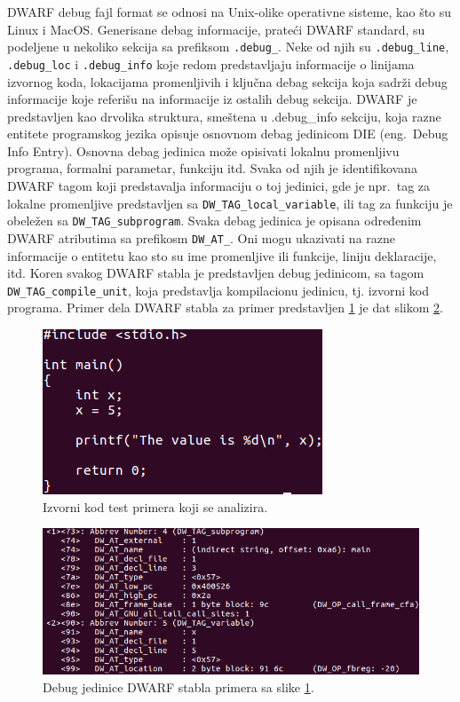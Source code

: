\documentclass[12pt,oneside]{memoir}
\begin{document}
DWARF debug fajl format se odnosi na Unix-olike operativne sisteme, kao što su Linux i MacOS. Generisane debag informacije, prateći DWARF standard, su podeljene u nekoliko sekcija sa prefiksom \texttt{.debug\_}. Neke od njih su \texttt{.debug\_line}, \texttt{.debug\_loc} i \texttt{.debug\_info} koje redom predstavljaju informacije o linijama izvornog koda, lokacijama promenljivih i ključna debag sekcija koja sadrži debug informacije koje referišu na informacije iz ostalih debug sekcija.
DWARF je predstavljen kao drvolika struktura, smeštena u .debug\_info sekciju,  koja razne entitete programskog jezika opisuje osnovnom debag jedinicom DIE (eng.~Debug Info Entry). Osnovna debag jedinica može opisivati lokalnu promenljivu programa, formalni parametar, funkciju itd. Svaka od njih je identifikovana DWARF tagom koji predstavalja informaciju o toj jedinici, gde je npr.~tag za lokalne promenljive predstavljen sa \texttt{DW\_TAG\_local\_variable}, ili tag za funkciju je obeležen sa \texttt{DW\_TAG\_subprogram}. Svaka debag jedinica je opisana određenim DWARF atributima sa prefikosm \texttt{DW\_AT\_}. Oni mogu ukazivati na razne informacije o entitetu kao sto su ime promenljive ili funkcije, liniju deklaracije, itd. Koren svakog DWARF stabla je predstavljen debug jedinicom, sa tagom  \texttt{DW\_TAG\_compile\_unit}, koja predstavlja kompilacionu jedinicu, tj. izvorni kod programa. Primer dela DWARF stabla za primer predstavljen \ref{fig:testPrimer} je dat slikom \ref{fig:dwarfPrimer}.

\begin{figure}[h!]
	\begin{center}
		\includegraphics[scale=0.8]{slike/testPrimer.png}
	\end{center}
	\caption{Izvorni kod test primera koji se analizira.}
	\label{fig:testPrimer}
\end{figure}

\begin{figure}[h!]
	\begin{center}
		\includegraphics[scale=0.6]{slike/dwarfPrimer.png}
	\end{center}
	\caption{Debug jedinice DWARF stabla primera sa slike \ref{fig:testPrimer}.}
	\label{fig:dwarfPrimer}
\end{figure}
\end{document}
